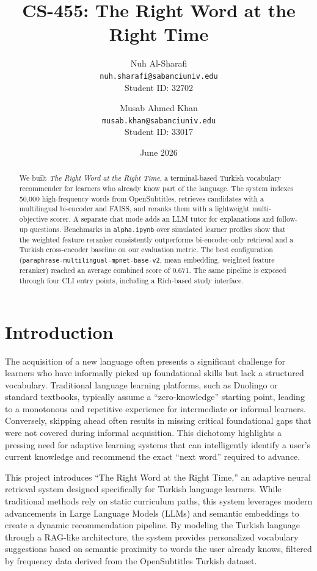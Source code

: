 \documentclass{article}
\title{CS-455: The Right Word at the Right Time}
\author{
  Nuh Al-Sharafi\\
  \texttt{nuh.sharafi@sabanciuniv.edu}\\
  Student ID: 32702
  \and
  Musab Ahmed Khan\\
  \texttt{musab.khan@sabanciuniv.edu}\\
  Student ID: 33017
}
\date{June 2026}
\begin{document}
\maketitle

\begin{abstract}
We built \textit{The Right Word at the Right Time}, a terminal-based Turkish vocabulary recommender for learners who already know part of the language. The system indexes 50{,}000 high-frequency words from OpenSubtitles, retrieves candidates with a multilingual bi-encoder and FAISS, and reranks them with a lightweight multi-objective scorer. A separate chat mode adds an LLM tutor for explanations and follow-up questions. Benchmarks in \texttt{alpha.ipynb} over simulated learner profiles show that the weighted feature reranker consistently outperforms bi-encoder-only retrieval and a Turkish cross-encoder baseline on our evaluation metric. The best configuration (\texttt{paraphrase-multilingual-mpnet-base-v2}, mean embedding, weighted feature reranker) reached an average combined score of 0.671. The same pipeline is exposed through four CLI entry points, including a Rich-based study interface.
\end{abstract}

\section{Introduction}

The acquisition of a new language often presents a significant challenge for learners who have informally picked up foundational skills but lack a structured vocabulary. Traditional language learning platforms, such as Duolingo or standard textbooks, typically assume a ``zero-knowledge'' starting point, leading to a monotonous and repetitive experience for intermediate or informal learners. Conversely, skipping ahead often results in missing critical foundational gaps that were not covered during informal acquisition. This dichotomy highlights a pressing need for adaptive learning systems that can intelligently identify a user's current knowledge and recommend the exact ``next word'' required to advance.

This project introduces ``The Right Word at the Right Time,'' an adaptive neural retrieval system designed specifically for Turkish language learners. While traditional methods rely on static curriculum paths, this system leverages modern advancements in Large Language Models (LLMs) and semantic embeddings to create a dynamic recommendation pipeline. By modeling the Turkish language through a RAG-like architecture, the system provides personalized vocabulary suggestions based on semantic proximity to words the user already knows, filtered by frequency data derived from the OpenSubtitles Turkish dataset.
\end{document}
